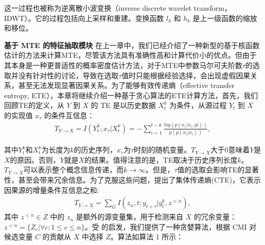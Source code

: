 这一过程也被称为逆离散小波变换（inverse discrete wavelet transform，IDWT）。它的过程包括向上采样和重建。变换函数 $l_{k}$ 和 $h_{k}$ 是上一级函数的缩放和移位。

\textbf{基于 MTE 的特征抽取模块} 在上一章中，我们已经介绍了一种新型的基于核函数估计的方法来计算MTE，尽管该方法具有准确性高和计算代价小的优点。但由于其本身是一种更普适性的概率密度估计方法，对于MTE中参数马尔可夫阶数$\tau$的选取并没有针对性的讨论，导致在选取$\tau$值时只能根据经验选择，会出现虚假因果关系，甚至无法发现显著因果关系。为了能够有效传递熵（effective transfer entropy, ETE），本章将继续介绍一种基于贪心算法的ETE计算方法，首先，我们回顾TE的定义，从 $Y$ 到 $X$ 的 TE 是以历史数据 $X_{t}^{k}$ 为条件，从源过程 $Y_{t}$ 到 $X$ 的实现值 $x_{\tau}$ 的条件互信息：
\begin{equation}\label{TE}
\begin{array}{ll}
T_{Y\rightarrow X}=I(Y_{t}^{k};x_{\tau} |X_{t}^{k})=-\sum^{t-k}_{i=1}\frac{log(p(x_{\tau}|x_{i},y{i}))}{p(p(x_{\tau}|x_{i}))},
\end{array}
\end{equation}

其中$Y_{t}^{k}$和$X_{t}^{k}$为长度为$k$的历史序列，$x_{\tau}$为$\tau$时刻的随机变量。$T_{Y\rightarrow X}$大于0意味着$Y$是$X$的原因。否则，$Y$就是$X$的结果。值得注意的是，TE取决于历史序列长度$k$。$T_{Y\rightarrow X}$可以表示整个概念信息传递，而$k\rightarrow \infty$。但是，$\tau$值的选取会影响TE的显著性，甚至会带来冗余信息。为了克服这些问题，\cite{31}提出了集体传递熵(CTE)，它表示因果源的增量条件互信息之和:
\begin{equation}\label{npl1}
\begin{array}{ll}
T_{Y\rightarrow X}=\sum\limits_{G} I(z_{n},t;y_{t+\tau}|y_{t}^{k},z^{<n}),
\end{array}
\end{equation}
其中 $z^{<n} \in Z$ 中的 $z_{n}$ 是额外的源变量集，用于检测来自 $X$ 的冗余变量：${z^{<n}}=\{Z_{c}|\forall c: 1\leq c \leq n\}$。受 \cite{32} 的启发，我们提供了一种贪婪算法，根据 CMI 对候选变量 $C$ 的贡献从 $X$ 中选择 $Z$。算法如算法 1 所示：

